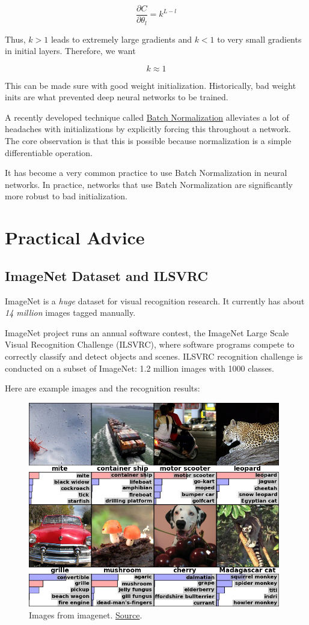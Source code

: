 \documentclass[a4paper]{tufte-handout}
\begin{document}
\[\frac{\partial C}{\partial \theta_l} = k^{L - l}\]

Thus, \(k > 1\) leads to extremely large gradients and \(k<1\) to very
small gradients in initial layers. Therefore, we want

\[k \approx 1\]

This can be made sure with good weight initialization. Historically, bad
weight inits are what prevented deep neural networks to be trained.

A recently developed technique called
\href{http://arxiv.org/abs/1502.03167}{Batch Normalization} alleviates a
lot of headaches with initializations by explicitly forcing this
throughout a network. The core observation is that this is possible
because normalization is a simple differentiable operation.

It has become a very common practice to use Batch Normalization in
neural networks. In practice, networks that use Batch Normalization are
significantly more robust to bad initialization.

\section{Practical Advice}\label{practical-advice}

\subsection{ImageNet Dataset and
ILSVRC}\label{imagenet-dataset-and-ilsvrc}

ImageNet is a \emph{huge} dataset for visual recognition research. It
currently has about \emph{14 million} images tagged manually.

ImageNet project runs an annual software contest, the ImageNet Large
Scale Visual Recognition Challenge (ILSVRC), where software programs
compete to correctly classify and detect objects and scenes. ILSVRC
recognition challenge is conducted on a subset of ImageNet: 1.2 million
images with 1000 classes.

Here are example images and the recognition results:
\begin{figure}
\includegraphics[width=110mm]{imagenet.png}
\caption{Images from imagenet.
\href{http://mappingignorance.org/fx/media/2013/04/Deep-learning-5.png}{Source}.
}  
\end{figure}
\end{document}
